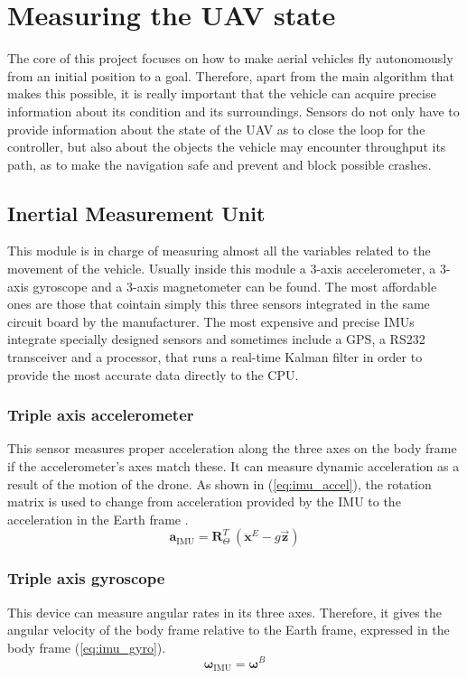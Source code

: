 \documentclass[journal]{IEEEtran}
\newcommand*{\subb}[1]{_{\mathrm{#1}}}
\begin{document}
	\section{Measuring the UAV state}
	The core of this project focuses on how to make aerial vehicles fly autonomously from an initial position to a goal. Therefore, apart from the main algorithm that makes this possible, it is really important that the vehicle can acquire precise information about its condition and its surroundings. Sensors do not only have to provide information about the state of the UAV as to close the loop for the controller, but also about the objects the vehicle may encounter throughput its path, as to make the navigation safe and prevent and block possible crashes.\\

		\subsection{Inertial Measurement Unit}
		This module is in charge of measuring almost all the variables related to the movement of the vehicle. Usually inside this module  a 3-axis accelerometer, a 3-axis gyroscope and a 3-axis magnetometer can be found. The most affordable ones are those that cointain simply this three sensors integrated in the same circuit board by the manufacturer. The most expensive and precise IMUs integrate specially designed sensors and sometimes include a GPS, a RS232 transceiver and a processor, that runs a real-time Kalman filter in order to provide the most accurate data directly to the CPU. \\
		

		\subsubsection{Triple axis accelerometer} This sensor measures proper acceleration along the three axes on the body frame if the accelerometer's axes match these. It can measure dynamic acceleration as a result of the motion of the drone.  As shown in (\ref{eq:imu_accel}), the rotation matrix is used to change from acceleration provided by the IMU to the acceleration in the Earth frame \cite{modelling_control_mahony}.\\
		\begin{equation} \label{eq:imu_accel}
		\bm{a}\subb{IMU}= \bm{R}^T_\Theta \ (\bm{\ddot{x}}^E - g \bm{\vec{z}})
		\end{equation}
		
		\subsubsection{Triple axis gyroscope} This device can measure angular rates in its three axes. Therefore, it  gives the angular velocity of the body frame relative to the Earth frame, expressed in the body frame (\ref{eq:imu_gyro}).\\
		\begin{equation} \label{eq:imu_gyro}
		\bm{\omega}\subb{IMU}= \bm{\omega}^B 
		\end{equation}
		
\end{document}
